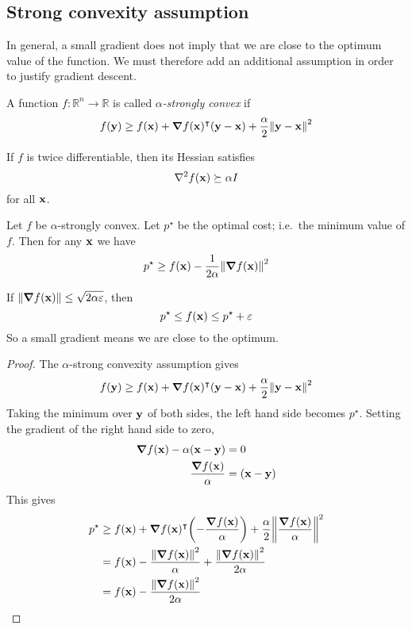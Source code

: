 \subsection{Strong convexity assumption}
In general, a small gradient does not imply that we are close to the optimum value of the function.
We must therefore add an additional assumption in order to justify gradient descent.
\begin{definition}
	A function \(f \colon \mathbb R^n \to \mathbb R\) is called \textit{\(\alpha\)-strongly convex} if
	\[
		f(\vb y) \geq f(\vb x) + \grad{f(\vb x)}^\intercal (\vb y - \vb x) + \frac{\alpha}{2}\norm{\vb y - \vb x}^2
	\]
\end{definition}
If \(f\) is twice differentiable, then its Hessian satisfies
\[
	\laplacian{f(\vb x)} \succeq \alpha I
\]
for all \(\vb x\).
\begin{claim}
	Let \(f\) be \(\alpha\)-strongly convex.
	Let \(p^\star\) be the optimal cost; i.e.\ the minimum value of \(f\).
	Then for any \(\vb x\) we have
	\[
		p^\star \geq f(\vb x) - \frac{1}{2\alpha}\norm{\grad{f(\vb x)}}^2
	\]
\end{claim}
\begin{remark}
	If \(\norm{\grad{f(\vb x)}} \leq \sqrt{2\alpha\varepsilon}\), then
	\[
		p^\star \leq f(\vb x) \leq p^\star + \varepsilon
	\]
	So a small gradient means we are close to the optimum.
\end{remark}
\begin{proof}
	The \(\alpha\)-strong convexity assumption gives
	\[
		f(\vb y) \geq f(\vb x) + \grad{f(\vb x)}^\intercal (\vb y - \vb x) + \frac{\alpha}{2}\norm{\vb y - \vb x}^2
	\]
	Taking the minimum over \(\vb y\) of both sides, the left hand side becomes \(p^\star\).
	Setting the gradient of the right hand side to zero,
	\begin{align*}
		\grad{f(\vb x)} - \alpha (\vb x - \vb y) & = 0               \\
		\frac{\grad{f(\vb x)}}{\alpha}           & = (\vb x - \vb y) \\
	\end{align*}
	This gives
	\begin{align*}
		p^\star & \geq f(\vb x) + \grad{f(\vb x)}^\intercal \qty(-\frac{\grad{f(\vb x)}}{\alpha}) + \frac{\alpha}{2}\norm{\frac{\grad{f(\vb x)}}{\alpha}}^2 \\
		        & = f(\vb x) - \frac{\norm{\grad{f(\vb x)}}^2}{\alpha} + \frac{\norm{\grad{f(\vb x)}}^2}{2\alpha}                                            \\
		        & = f(\vb x) - \frac{\norm{\grad{f(\vb x)}}^2}{2\alpha}
	\end{align*}
\end{proof}
